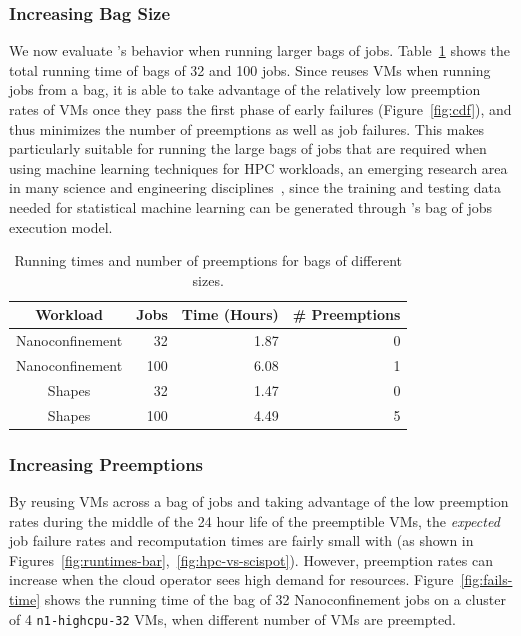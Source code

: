 \subsubsection{Increasing Bag Size}

We now evaluate \sysname's behavior when running larger bags of jobs.
Table~\ref{tab:100-jobs} shows the total running time of bags of 32 and 100 jobs.
Since \sysname reuses VMs when running jobs from a bag, it is able to take advantage of the relatively low preemption rates of VMs once they pass the first phase of early failures (Figure~\ref{fig:cdf}), and thus minimizes the number of preemptions as well as job failures. 
This makes \sysname particularly suitable for running the large bags of jobs that are required when using machine learning techniques for HPC workloads, an emerging research area in many science and engineering disciplines~\cite{ml.atomic2017,melko2017,sam2017,fu2017,long2015machine,ferguson2017machine,ward2018matminer,jcs1,jcs2,fox2019learning}, since the training and testing data needed for statistical machine learning can be generated through \sysname's bag of jobs execution model. 


\begin{table}
  \begin{tabular}{|c|r|r|r|}
    \hline
    Workload & Jobs & Time (Hours) & \# Preemptions \\
    \hline
    Nanoconfinement & 32  & 1.87 & 0 \\
    Nanoconfinement & 100  & 6.08 & 1 \\
    \hline
    Shapes & 32 & 1.47 & 0 \\
    Shapes & 100 & 4.49 & 5  \\  
    \hline
  \end{tabular}
  \caption{Running times and number of preemptions for bags of different sizes. }
  \label{tab:100-jobs}
  \vspace*{\myfigspace}
\end{table}




\subsubsection{Increasing Preemptions}

By reusing VMs across a bag of jobs and taking advantage of the low preemption rates during the middle of the 24 hour life of the preemptible VMs, the \emph{expected} job failure rates and recomputation times are fairly small with \sysname (as shown in Figures~\ref{fig:runtimes-bar},~\ref{fig:hpc-vs-scispot}).
However, preemption rates can increase when the cloud operator sees high demand for resources.
Figure~\ref{fig:fails-time} shows the running time of the bag of 32 Nanoconfinement jobs on a cluster of 4 \texttt{n1-highcpu-32} VMs, when different number of VMs are preempted. 

